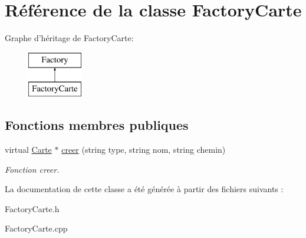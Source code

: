 \hypertarget{classFactoryCarte}{\section{\-Référence de la classe \-Factory\-Carte}
\label{classFactoryCarte}
}
\-Graphe d'héritage de \-Factory\-Carte\-:\begin{figure}[H]
\begin{center}
\leavevmode
\includegraphics[height=2.000000cm]{classFactoryCarte}
\end{center}
\end{figure}
\subsection*{\-Fonctions membres publiques}
\begin{DoxyCompactItemize}
\item 
\hypertarget{classFactoryCarte_aaca6e8fe045a19c4ac1a6746abfb23bc}{virtual \hyperlink{classCarte}{\-Carte} $\ast$ \hyperlink{classFactoryCarte_aaca6e8fe045a19c4ac1a6746abfb23bc}{creer} (string type, string nom, string chemin)}\label{classFactoryCarte_aaca6e8fe045a19c4ac1a6746abfb23bc}

\begin{DoxyCompactList}\small\item\em \-Fonction creer. \end{DoxyCompactList}\end{DoxyCompactItemize}


\-La documentation de cette classe a été générée à partir des fichiers suivants \-:\begin{DoxyCompactItemize}
\item 
\-Factory\-Carte.\-h\item 
\-Factory\-Carte.\-cpp\end{DoxyCompactItemize}
